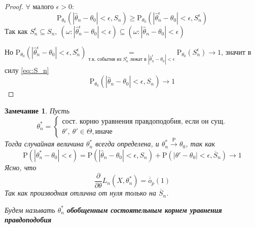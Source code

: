 \documentclass[12pt]{article}
\newtheorem*{remark}{Замечание}
\theoremstyle{basic_theorem}
\theoremstyle{name_theorem}
\newcommand\defin[1]{\textbf{#1}}
\def\P{
    \mathrm{P}
}
\def\littleO{
    \overline{\overline{o}}
}
\begin{document}
\begin{proof}
        $\forall \text{ малого } \epsilon > 0$:
        \begin{equation}
            \label{eq::S_n}
            \P_{\theta_0}(|\hat{\theta}_n - \theta_0| < \epsilon, S_n) \geq
            \P_{\theta_0}(|\hat{\theta}^\epsilon_n - \theta_0| < \epsilon, S_n^\epsilon)
        \end{equation}
        Так как $S^\epsilon_n \subseteq S_n,\
        (\omega: |\hat{\theta}^\epsilon_n - \theta_0| < \epsilon) \subseteq
        (\omega: |\hat{\theta}_n - \theta_0| < \epsilon)$
        
        Но $\P_{\theta_0}(|\hat{\theta}^\epsilon_n - \theta_0| < \epsilon, S^\epsilon_n) 
        \underset{\text{т.к. события из } S_n^\epsilon \text{ лежат в } |\hat{\theta}^\epsilon_n - \theta_0| < \epsilon}{=}
        \P_{\theta_0}(S_n^\epsilon) \rightarrow 1$, значит в силу \eqref{eq::S_n}
        $$\P_{\theta_0} (|\hat{\theta}_n - \theta_0| < \epsilon, S_n) \rightarrow 1$$
    \end{proof}

    \begin{remark}
        Пусть 
        $$\theta^*_n = \begin{cases}
            \text{сост. корню уравнения правдоподобия, если он сущ.} \\
            \theta',\ \theta'\in\Theta, \text{иначе}
        \end{cases}$$
        Тогда случайная величина $\theta^*_n$ всегда определена, и
        $\theta^*_n \xrightarrow{\P} \theta_0$, так как
        $$\P(|\theta^*_n - \theta_0| < \epsilon) =
        \P(|\hat{\theta}_n - \theta_0| < \epsilon, S_n) +
        \P(|\theta' - \theta_0| < \epsilon, \overline{S}_n) \rightarrow 1$$
        Ясно, что 
        \begin{equation}
            \frac{\partial}{\partial\theta} L_n(X, \theta^*_n) = \littleO_p(1)
        \end{equation}
        Так как производная отлична от нуля только на $\overline{S}_n$.

        Будем называть $\theta_n^*$ \defin{обобщенным состоятельным корнем уравнения
        правдоподобия}
    \end{remark}
\end{document}
